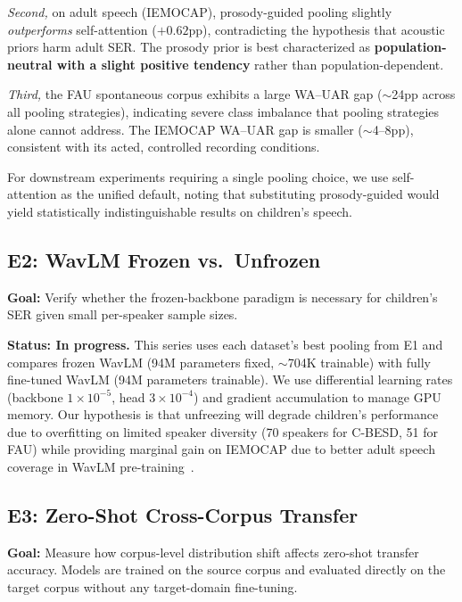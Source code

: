 \documentclass[11pt,a4paper]{article}
\begin{document}
\textit{Second,} on adult speech (IEMOCAP), prosody-guided pooling slightly
\textit{outperforms} self-attention ($+0.62$pp), contradicting the hypothesis
that acoustic priors harm adult SER. The prosody prior is best characterized as
\textbf{population-neutral with a slight positive tendency} rather than
population-dependent.

\textit{Third,} the FAU spontaneous corpus exhibits a large WA--UAR gap
($\sim$24pp across all pooling strategies), indicating severe class imbalance
that pooling strategies alone cannot address. The IEMOCAP WA--UAR gap is
smaller ($\sim$4--8pp), consistent with its acted, controlled recording
conditions.

For downstream experiments requiring a single pooling choice, we use
self-attention as the unified default, noting that substituting prosody-guided
would yield statistically indistinguishable results on children's speech.

\subsection{E2: WavLM Frozen vs.\ Unfrozen}
\label{ssec:e2}

\textbf{Goal:} Verify whether the frozen-backbone paradigm is necessary for
children's SER given small per-speaker sample sizes.

\textbf{Status: In progress.} This series uses each dataset's best pooling from
E1 and compares frozen WavLM (94M parameters fixed, $\sim$704K trainable) with
fully fine-tuned WavLM (94M parameters trainable). We use differential learning
rates (backbone $1\times10^{-5}$, head $3\times10^{-4}$) and gradient
accumulation to manage GPU memory. Our hypothesis is that unfreezing will
degrade children's performance due to overfitting on limited speaker diversity
(70 speakers for C-BESD, 51 for FAU) while providing marginal gain on IEMOCAP
due to better adult speech coverage in WavLM pre-training~\cite{chen2022wavlm}.

\subsection{E3: Zero-Shot Cross-Corpus Transfer}
\label{ssec:e3}

\textbf{Goal:} Measure how corpus-level distribution shift affects zero-shot
transfer accuracy. Models are trained on the source corpus and evaluated
directly on the target corpus without any target-domain fine-tuning.
\end{document}
